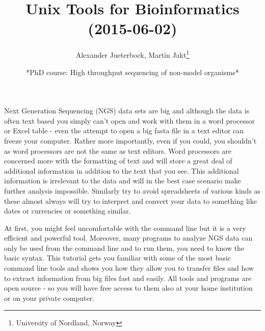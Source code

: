 \documentclass[11pt]{article}
\title{\textbf{Unix Tools for Bioinformatics} (2015-06-02)}
\author{Alexander Jueterbock, Martin Jakt\thanks{University of Nordland, Norway}}
\date{*PhD course: High throughput sequencing of non-model organisms*}
\begin{document}
\maketitle

\setcounter{tocdepth}{3}
\tableofcontents
\vspace*{1cm}









                                                



                                        

                                

















Next Generation Sequencing (NGS) data sets are big and although the data is
often text based you
simply can't open and work with them in a word processor or Excel
table - even the attempt to open a big fasta file in a text editor can
freeze your computer. Rather more importantly, even if you could, you
shouldn't as word processors are not the same as text editors. Word
processors are concerned more with the formatting of text and will store a
great deal of additional information in addition to the text that you
see. This additional information is irrelevant to the data and will in the
best case scenario make further analysis impossible. Similarly try to avoid
spreadsheets of various kinds as these almost always will try to interpret
and convert your data to something like dates or currencies or something similar.

At first, you might feel uncomfortable with the
command line but it is a very efficient and powerful tool. Moreover,
many programs to analyze NGS data can only be used from the command line and to
run them, you need to know the basic syntax. This tutorial gets you
familiar with some of the most basic command line tools and shows
you how they allow you to transfer files and how to extract
information from big files fast and easily. All tools and programs are
open source - so you will have free access to them also at your home
institution or on your private computer.
\end{document}
